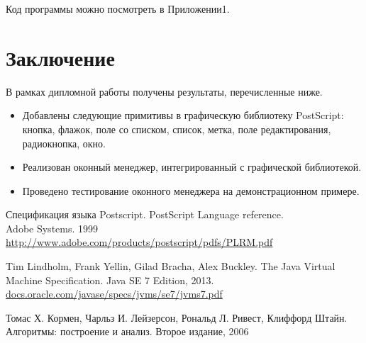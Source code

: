 \documentclass[14pt]{extarticle}
\begin{document}
	Код программы можно посмотреть в Приложении1.
	
	\pagebreak
	\section*{Заключение}
	
	В рамках дипломной работы получены результаты, перечисленные ниже.
	\begin{itemize}
		\item Добавлены следующие примитивы в графическую библиотеку  PostScript: кнопка, флажок, поле со списком, список, метка, поле редактирования, радиокнопка, окно.
		\item Реализован оконный менеджер, интегрированный с графической библиотекой.
		\item Проведено тестирование оконного менеджера на демонстрационном примере.
	\end{itemize}
	

	
	\pagebreak
	
	
	
	\begin{thebibliography}{}
		
		Спецификация языка Postscript. PostScript Language reference. \\
		Adobe Systems. 1999\\
		\url{http://www.adobe.com/products/postscript/pdfs/PLRM.pdf}
		
		Tim Lindholm, Frank Yellin, Gilad Bracha, Alex Buckley.
		The Java Virtual Machine Specification.
		Java SE 7 Edition, 2013. \\
		\url{docs.oracle.com/javase/specs/jvms/se7/jvms7.pdf}
		
		Томас Х. Кормен, Чарльз И. Лейзерсон, Рональд Л. Ривест, Клиффорд Штайн.
		Алгоритмы: построение и анализ.
		Второе издание, 2006
		
	\end{thebibliography}
\end{document}
